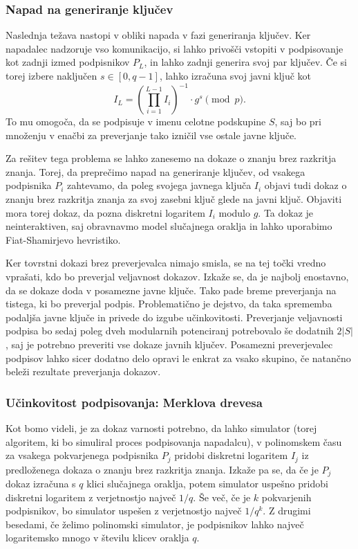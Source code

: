 \documentclass[isrm2, tisk]{fmfdelo}
\begin{document}
\subsubsection{Napad na generiranje ključev}
Naslednja težava nastopi v obliki napada v fazi generiranja ključev. Ker napadalec nadzoruje vso komunikacijo, 
si lahko privošči vstopiti v podpisovanje kot zadnji izmed podpisnikov $P_L$, in lahko zadnji generira svoj
par ključev. Če si torej izbere naključen $s \in [0, q- 1]$, lahko izračuna svoj javni ključ kot 
$$ 
I_L = \left( \prod_{i=1}^{L-1} I_i \right)^{-1} \cdot g^s \pmod p.
$$
To mu omogoča, da se podpisuje v imenu celotne podskupine $S$, saj bo pri množenju v enačbi za preverjanje
tako izničil vse ostale javne ključe.

Za rešitev tega problema se lahko zanesemo na dokaze o znanju brez razkritja znanja.
Torej, da preprečimo napad na generiranje ključev, od vsakega podpisnika $P_i$ zahtevamo, da poleg 
svojega javnega ključa $I_i$ objavi tudi dokaz o znanju brez razkritja znanja za svoj zasebni ključ 
glede na javni ključ. Objaviti mora torej dokaz, da pozna diskretni logaritem $I_i$ modulo $g$. 
Ta dokaz je neinteraktiven, saj obravnavmo model slučajnega oraklja in lahko uporabimo Fiat-Shamirjevo 
hevristiko.

Ker tovrstni dokazi brez preverjevalca nimajo smisla, se na tej točki vredno vprašati, kdo bo preverjal 
veljavnost dokazov. Izkaže se, da je najbolj enostavno, da se dokaze doda v posamezne javne ključe. 
Tako pade breme preverjanja na tistega, ki bo preverjal podpis. Problematično je dejstvo, da taka 
sprememba podaljša javne ključe in privede do izgube učinkovitosti. Preverjanje veljavnosti podpisa 
bo sedaj poleg dveh modularnih potenciranj potrebovalo še dodatnih $2|S|$, saj je potrebno preveriti 
vse dokaze javnih ključev. Posamezni preverjevalec podpisov lahko sicer dodatno delo opravi le enkrat 
za vsako skupino, če natančno beleži rezultate preverjanja dokazov.

\subsubsection{Učinkovitost podpisovanja: Merklova drevesa}
Kot bomo videli, je za dokaz varnosti potrebno, da lahko simulator (torej algoritem, ki bo simuliral
proces podpisovanja napadalcu), v polinomskem času za vsakega pokvarjenega podpisnika $P_j$ pridobi
diskretni logaritem $I_j$ iz predloženega dokaza o znanju brez razkritja znanja. Izkaže pa se, da če
je $P_j$ dokaz izračuna s $q$ klici slučajnega oraklja, potem simulator uspešno pridobi diskretni
logaritem z verjetnostjo največ $1/q$. Še več, če je $k$ pokvarjenih podpisnikov, bo simulator
uspešen z verjetnostjo največ $1/q^k$. Z drugimi besedami, če želimo polinomski simulator, je
podpisnikov lahko največ logaritemsko mnogo v številu klicev oraklja $q$.
\end{document}
